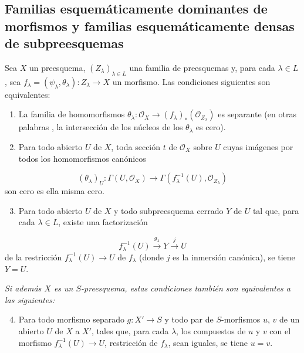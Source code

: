 \subsection{Familias esquemáticamente dominantes de morfismos y familias esquemáticamente densas de subpreesquemas}
\label{subsection:IV.11.10}

\begin{proposition}[11.10.1]
\label{IV.11.10.1}
Sea $X$ un preesquema, $(Z_\lambda)_{\lambda\in L}$ una familia de preesquemas y, para cada $\lambda\in L$, sea $f_\lambda=(\psi_\lambda,\theta_\lambda):Z_\lambda\to X$ un morfismo.
Las condiciones siguientes son equivalentes:
\begin{enumerate}[label=\emph{\alph*)}]
  \item La familia de homomorfismos $\theta_\lambda:\mathcal O_X\to(f_\lambda)_*(\mathcal O_{Z_\lambda})$ es separante \textup{(en otras palabras , la intersección de los núcleos de los $\theta_\lambda$ es} cero\textup{)}.
  \item Para todo abierto $U$ de $X$, toda sección $t$ de $\mathcal O_X$ sobre $U$ cuyas imágenes por todos los homomorfismos canónicos
\end{enumerate}
\[
  (\theta_\lambda)_U:\Gamma(U,\mathcal O_X)
  \longrightarrow\Gamma(f_\lambda^{-1}(U),\mathcal O_{Z_\lambda})
  \tag{11.10.1.1}
  \label{IV.11.10.1.1-fr}
  \]
son cero es ella misma cero.
\begin{enumerate}[label=\emph{\alph*)}]
\setcounter{enumi}{2}
  \item Para todo abierto $U$ de $X$ y todo subpreesquema cerrado $Y$ de $U$ tal que, para cada $\lambda\in L$, existe una factorización
\end{enumerate}
\[
  f_\lambda^{-1}(U)\xrightarrow{g_\lambda}Y\xrightarrow{j}U
  \tag{11.10.1.2}
  \label{IV.11.10.1.2-fr}
  \]
de la restricción $f_\lambda^{-1}(U)\to U$ de $f_\lambda$ \textup{(donde $j$ es la inmersión canónica)}, se tiene $Y=U$.

\emph{Si además $X$ es un $S$-preesquema, estas condiciones también son equivalentes a las siguientes:}
\begin{enumerate}[label=\emph{\alph*)}]
\setcounter{enumi}{3}
  \item Para todo morfismo separado $g:X'\to S$ y todo par de $S$-morfismos $u$, $v$ de un abierto $U$ de $X$ a $X'$, tales que, para cada $\lambda$, los compuestos de $u$ y $v$ con el morfismo $f_\lambda^{-1}(U)\to U$, restricción de $f_\lambda$, sean iguales, se tiene $u=v$.
\end{enumerate}
\end{proposition}

